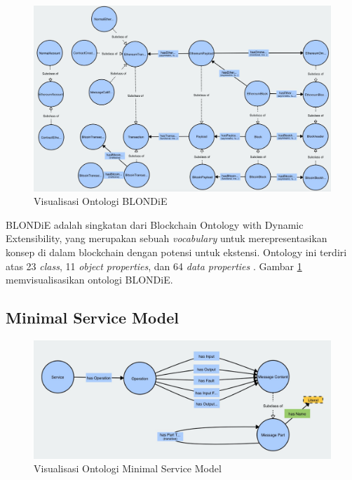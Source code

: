 \begin{figure}
  \centering
  \includegraphics[width=1\textwidth]{resources/chapter-2/blondie-visualization.jpg}
  \caption{Visualisasi Ontologi BLONDiE \parencite{third2017linked}}
  \label{image:blondie-visualization}
\end{figure}

BLONDiE adalah singkatan dari Blockchain Ontology with Dynamic Extensibility, yang merupakan sebuah \textit{vocabulary} untuk merepresentasikan konsep di dalam blockchain dengan potensi untuk ekstensi. Ontology ini terdiri atas 23 \textit{class}, 11 \textit{object properties}, dan 64 \textit{data properties} \parencite{hector2020blondie}. Gambar \ref{image:blondie-visualization} memvisualisasikan ontologi BLONDiE.

\subsection{Minimal Service Model}
\label{subsec:minimal-service-model}

\begin{figure}
  \centering
  \includegraphics[width=1\textwidth]{resources/chapter-2/msm-visualization.jpg}
  \caption{Visualisasi Ontologi Minimal Service Model \parencite{third2017linked}}
  \label{image:msm-visualization}
\end{figure}

